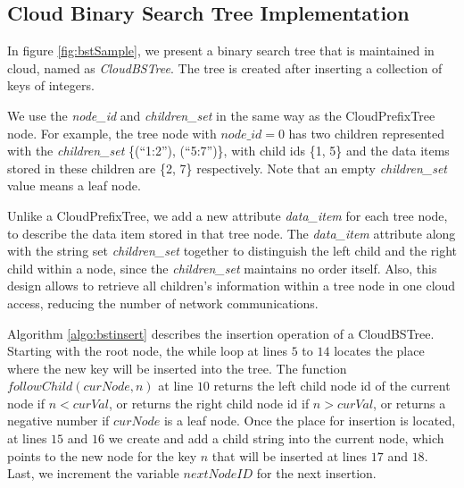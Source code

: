 \documentclass[10pt, conference, compsocconf]{IEEEtran}
\newcommand{\remove}[1]{}
\begin{document}
\subsection{Cloud Binary Search Tree Implementation}
\label{bst}
In figure \ref{fig:bstSample}, we present a binary search tree that is maintained in cloud, named as
\emph{CloudBSTree}. The tree is created after inserting a collection of keys of integers.

We use the \emph{node\_id} and \emph{children\_set} in the same way as the CloudPrefixTree node.
For example, 
the tree node with $node\_id = 0$ has two children represented with the \emph{children\_set} \{(``1:2''), (``5:7'')\}, with child ids \{1, 5\} and the data items stored in these children are
\{2, 7\} respectively. Note that an empty \emph{children\_set} value means a leaf node.

Unlike a CloudPrefixTree, we add a new attribute \emph{data\_item} for each tree node, 
to describe the data item stored in that tree node. The \emph{data\_item} attribute along with 
the string set \emph{children\_set} together to distinguish the left child and the right child within a node, 
since the \emph{children\_set} maintains no order itself. Also, this design allows to retrieve 
all children's information within a tree node in one cloud access, reducing the
number of network communications. 

\remove{
We present the query algorithm of a CloudBSTree in Algorithm \ref{algo:bstquery}.
Starting with the root node with id = $0$, we compare the key $n$ with the data item $curVal$ in the current node.
We stop the search if they are equal. Otherwise, we search in the left subtree of the current node if $n  <  curVal$, Or
we search in the right subtree of the current node if $n > curVal$. The function $followChild(curNode, n)$ at line $7$
returns the left child node id of the current node if $n < curVal$, or returns the right child node id if $n > curVal$, or returns
a negative number if $curNode$ is a leaf node.
}

Algorithm \ref{algo:bstinsert} describes the insertion operation of a CloudBSTree.
Starting with the root node, the while loop at lines $5$ to $14$ locates the place where
the new key will be inserted into the tree. 
The function $followChild(curNode, n)$ at line $10$
returns the left child node id of the current node if $n < curVal$, or returns the right child node id if $n > curVal$, or returns
a negative number if $curNode$ is a leaf node.
Once the place for insertion is located, at lines $15$ and $16$ we create and add a child string into 
the current node, which points to the new node for the key $n$ that will be inserted at lines $17$ and $18$.
Last, we increment the variable $nextNodeID$ for the next insertion.
\end{document}
